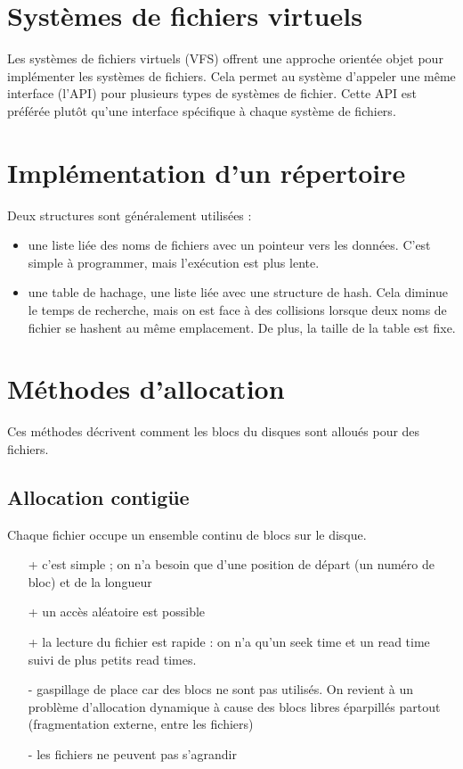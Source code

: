 \section{Systèmes de fichiers virtuels}

Les systèmes de fichiers virtuels (VFS) offrent une approche orientée objet pour implémenter les systèmes de fichiers. Cela permet au système d'appeler une même interface (l'API) pour plusieurs types de systèmes de fichier. Cette API est préférée plutôt qu'une interface spécifique à chaque système de fichiers.

\section{Implémentation d'un répertoire}

Deux structures sont généralement utilisées :

\begin{itemize}
	\item une liste liée des noms de fichiers avec un pointeur vers les données. C'est simple à programmer, mais l'exécution est plus lente.
	\item une table de hachage, une liste liée avec une structure de hash. Cela diminue le temps de recherche, mais on est face à des collisions lorsque deux noms de fichier se hashent au même emplacement. De plus, la taille de la table est fixe.
\end{itemize}


\section{Méthodes d'allocation}

	Ces méthodes décrivent comment les blocs du disques sont alloués pour des fichiers.

	\subsection{Allocation contigüe}
	
	Chaque fichier occupe un ensemble continu de blocs sur le disque.
	
	\begin{itemize}
		\item[+] c'est simple ; on n'a besoin que d'une position de départ (un numéro de bloc) et de la longueur
		\item[+] un accès aléatoire est possible
		\item[+] la lecture du fichier est rapide : on n'a qu'un seek time et un read time suivi de plus petits read times.
		\item[-] gaspillage de place car des blocs ne sont pas utilisés. On revient à un problème d'allocation dynamique à cause des blocs libres éparpillés partout (fragmentation externe, entre les fichiers)
		\item[-] les fichiers ne peuvent pas s'agrandir
	\end{itemize}
			
